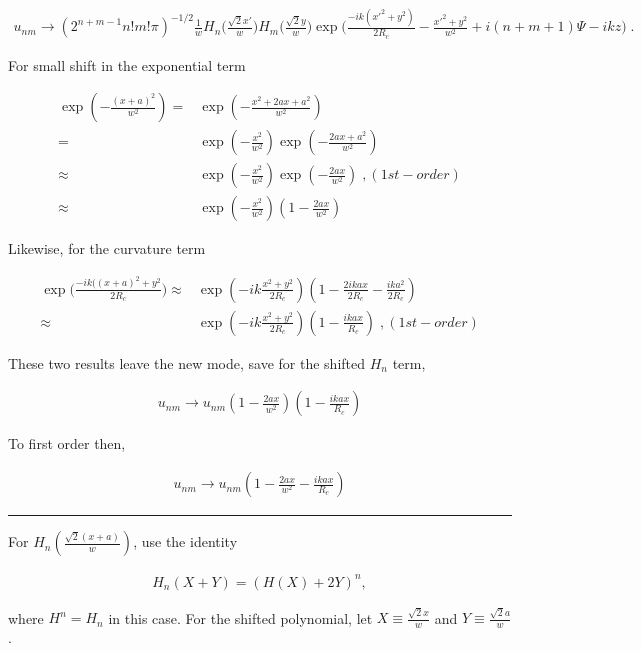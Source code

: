 \documentclass[aps,twoside,secnumarabic,balancelastpage,amsmath,amssymb,nofootinbib,hyperref=pdftex]{revtex4}
\begin{document}
\begin{align*}
	u_{nm} \rightarrow
		(2^{n+m-1}n!m!\pi)^{-1/2}
		\frac{1}{w}
		H_{n} \Big(\frac{\sqrt{2}x'}{w} \Big)
		H_{m} \Big(\frac{\sqrt{2}y}{w} \Big)
		\exp \Big(\frac{-ik(x'^{2}+y^{2})}{2R_{c}}-
		\frac{x'^{2}+y^{2}}{w^{2}} 
		+i(n+m+1)\Psi - ikz
		\Big)\;
		.
\end{align*}

For small shift in the exponential term

\begin{align*}
\exp( -\frac{(x+a)^2}{w^2})
=&
	\exp( -\frac{x^2+2ax+a^2}{w^2})
	\\=&
	\exp( -\frac{x^2}{w^2})\exp( -\frac{2ax+a^2}{w^2})
	\\ \approx &
	\exp( -\frac{x^2}{w^2})\exp( -\frac{2ax}{w^2})	\;,(1st-order)
	\\ \approx &
	\exp( -\frac{x^2}{w^2})( 1-\frac{2ax}{w^2})
\end{align*}

Likewise, for the curvature term

\begin{align*}
\exp \Big(\frac{-ik( (x+a)^{2}+y^{2}}{2R_{c}} \Big)
 \approx &
	\exp( -ik\frac{x^2+y^2}{2 R_c})
	( 1-\frac{2ikax}{2R_c}
	-\frac{ika^2}{2R_c})
	\\ \approx &
	\exp( -ik\frac{x^2+y^2}{2 R_c})
	( 1-\frac{ikax}{R_c})\;,(1st-order)
\end{align*}

These two results leave the new mode, save for the shifted $H_n$ term,

\begin{align*}
	u_{nm} \rightarrow u_{nm}( 1-\frac{2ax}{w^2})
	( 1-\frac{ikax}{R_c})
\end{align*}

To first order then,

\begin{align*}
	u_{nm} \rightarrow u_{nm}( 1-\frac{2ax}{w^2}-\frac{ikax}{R_c})
\end{align*}

\rule{\textwidth}{0.4pt}

For $H_n(\frac{\sqrt{2} (x+a) }{w})$, use the identity

\begin{align*}
	H_n(X+Y) = (H(X)+2Y)^n,
\end{align*}

where $H^n = H_n$ in this case. For the shifted polynomial, let $X \equiv \frac{\sqrt{2}x}{w}$ and $Y \equiv \frac{\sqrt{2}a}{w}$. 
\end{document}
